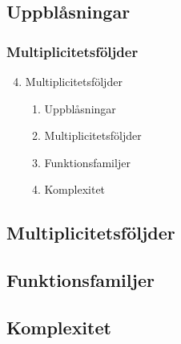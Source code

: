 \documentclass{beamer}
\begin{document}
\subsection{Uppblåsningar}


\begin{frame}
	\frametitle{Multiplicitetsföljder}
	\begin{enumerate}
		\setcounter{enumi}{3}
		\item<1-> Multiplicitetsföljder
		\begin{enumerate}
			\item<2-> Uppblåsningar
			\item<3-> Multiplicitetsföljder
			\item<4-> Funktionsfamiljer
			\item<5-> Komplexitet
		\end{enumerate}
	\end{enumerate}
\end{frame}

\begin{frame}
	\frametitle{}
\end{frame}

\begin{frame}
	\frametitle{}
\end{frame}

\begin{frame}
	\frametitle{}
\end{frame}

\begin{frame}
	\frametitle{}
\end{frame}

\begin{frame}
	\frametitle{}
\end{frame}

\begin{frame}
	\frametitle{}
\end{frame}

\begin{frame}
	\frametitle{}
\end{frame}




\subsection{Multiplicitetsföljder}
\subsection{Funktionsfamiljer}
\subsection{Komplexitet}
\end{document}
